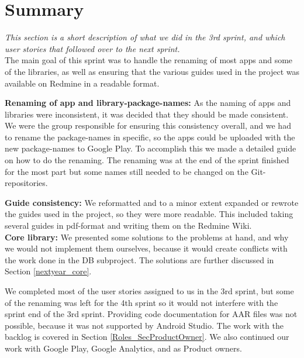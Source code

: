 \section{Summary}
\textit{This section is a short description of what we did in the 3rd sprint, and which user stories that followed over to the next sprint.}\\

The main goal of this sprint was to handle the renaming of most apps and some of the libraries, as well as ensuring that the various guides used in the project was available on Redmine in a readable format.

\textbf{Renaming of app and library-package-names:}
As the naming of apps and libraries were inconsistent, it was decided that they should be made consistent. We were the group responsible for ensuring this consistency overall, and we had to rename the package-names in specific, so the apps could be uploaded with the new package-names to Google Play. To accomplish this we made a detailed guide on how to do the renaming. The renaming was at the end of the sprint finished for the most part but some names still needed to be changed on the Git-repositories.

\textbf{Guide consistency:}
We reformatted and to a minor extent expanded or rewrote the guides used in the project, so they were more readable. This included taking several guides in pdf-format and writing them on the Redmine Wiki.\\

\textbf{Core library:}
We presented some solutions to the problems at hand, and why we would not implement them ourselves, because it would create conflicts with the work done in the DB subproject. The solutions are further discussed in Section \ref{nextyear_core}.

We completed most of the user stories assigned to us in the 3rd sprint, but some of the renaming was left for the 4th sprint so it would not interfere with the sprint end of the 3rd sprint. Providing code documentation for AAR files was not possible, because it was not supported by Android Studio. The work with the backlog is covered in Section \ref{Roles_SecProductOwner}. We also continued our work with Google Play, Google Analytics, and as Product owners.